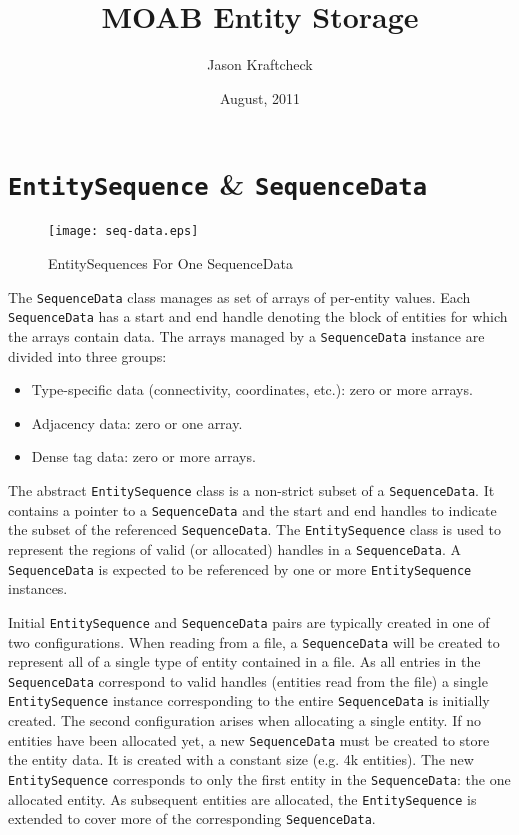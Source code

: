 \documentclass{report}
\title{MOAB Entity Storage}
\author{Jason Kraftcheck}
\date{August, 2011}
\begin{document}
\section{\texttt{EntitySequence} \& \texttt{SequenceData}}

\begin{figure*}[htbp]
\begin{center}
\texttt{[image: seq-data.eps]}
\caption{EntitySequences For One SequenceData}
\end{center}
\end{figure*}

The \texttt{SequenceData} class manages as set of arrays of per-entity values.  Each \texttt{SequenceData} has a start and end handle denoting the block of entities for which the arrays contain data.  The arrays managed by a \texttt{SequenceData} instance are divided into three groups:
\begin{itemize}
\item Type-specific data (connectivity, coordinates, etc.): zero or more arrays.
\item Adjacency data: zero or one array.
\item Dense tag data: zero or more arrays.
\end{itemize}

The abstract \texttt{EntitySequence} class is a non-strict subset of a \texttt{SequenceData}.  It contains a pointer to a \texttt{SequenceData}
and the start and end handles to indicate the subset of the referenced \texttt{SequenceData}.  The \texttt{EntitySequence} class is used to represent the regions of valid (or allocated) handles in a \texttt{SequenceData}.  A \texttt{SequenceData} is expected to be referenced by one or more \texttt{EntitySequence} instances.

Initial \texttt{EntitySequence} and \texttt{SequenceData} pairs are typically created in one of two configurations.  When reading from a file, a \texttt{SequenceData} will be created to represent all of a single type of entity contained in a file.  As all entries in the \texttt{SequenceData} correspond to valid handles (entities read from the file) a single \texttt{EntitySequence} instance corresponding to the entire \texttt{SequenceData} is initially created.  The second configuration arises when allocating a single entity.  If no entities have been allocated yet, a new \texttt{SequenceData} must be created to store the entity data.  It is created with a constant size (e.g. 4k entities).  The new \texttt{EntitySequence} corresponds to only the first entity in the \texttt{SequenceData}: the one allocated entity.  As subsequent entities are allocated, the \texttt{EntitySequence} is extended to cover more of the corresponding \texttt{SequenceData}. 
\end{document}
